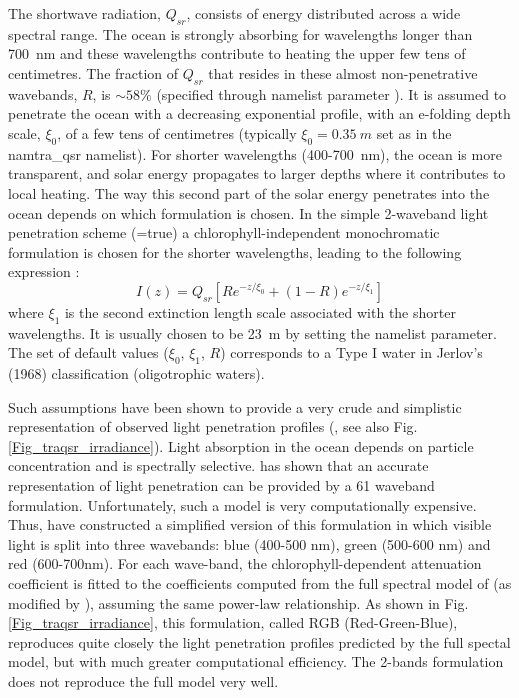 \documentclass[NEMO_book]{subfiles}
\begin{document}
The shortwave radiation,  $Q_{sr}$, consists of energy distributed across a wide spectral range. 
The ocean is strongly absorbing for wavelengths longer than 700~nm and these 
wavelengths contribute to heating the upper few tens of centimetres. The fraction of $Q_{sr}$ 
that resides in these almost non-penetrative wavebands, $R$, is $\sim 58\%$ (specified 
through namelist parameter ).  It is assumed to penetrate the ocean 
with a decreasing exponential profile, with an e-folding depth scale, $\xi_0$, 
of a few tens of centimetres (typically $\xi_0=0.35~m$ set as  in the namtra\_qsr namelist).
For shorter wavelengths (400-700~nm), the ocean is more transparent, and solar energy 
propagates to larger depths where it contributes to 
local heating. 
The way this second part of the solar energy penetrates into the ocean depends on 
which formulation is chosen. In the simple 2-waveband light penetration scheme  (=true) 
a chlorophyll-independent monochromatic formulation is chosen for the shorter wavelengths, 
leading to the following expression  \citep{Paulson1977}:
\begin{equation} \label{Eq_traqsr_iradiance}
I(z) = Q_{sr} \left[Re^{-z / \xi_0} + \left( 1-R\right) e^{-z / \xi_1} \right]
\end{equation}
where $\xi_1$ is the second extinction length scale associated with the shorter wavelengths.  
It is usually chosen to be 23~m by setting the  namelist parameter. 
The set of default values ($\xi_0$, $\xi_1$, $R$) corresponds to a Type I water in 
Jerlov's (1968) classification (oligotrophic waters).

Such assumptions have been shown to provide a very crude and simplistic 
representation of observed light penetration profiles (\cite{Morel_JGR88}, see also 
Fig.\ref{Fig_traqsr_irradiance}). Light absorption in the ocean depends on 
particle concentration and is spectrally selective. \cite{Morel_JGR88} has shown 
that an accurate representation of light penetration can be provided by a 61 waveband 
formulation. Unfortunately, such a model is very computationally expensive. 
Thus, \cite{Lengaigne_al_CD07} have constructed a simplified version of this 
formulation in which visible light is split into three wavebands: blue (400-500 nm), 
green (500-600 nm) and red (600-700nm). For each wave-band, the chlorophyll-dependent 
attenuation coefficient is fitted to the coefficients computed from the full spectral model 
of \cite{Morel_JGR88} (as modified by \cite{Morel_Maritorena_JGR01}), assuming 
the same power-law relationship. As shown in Fig.\ref{Fig_traqsr_irradiance}, 
this formulation, called RGB (Red-Green-Blue), reproduces quite closely 
the light penetration profiles predicted by the full spectal model, but with much greater 
computational efficiency. The 2-bands formulation does not reproduce the full model very well. 
\end{document}
